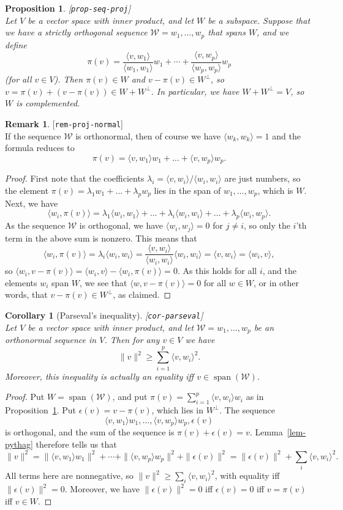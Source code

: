 \documentclass{amsart}
\newcommand{\lbl}[1]{\label{#1}\textup{[\texttt{#1}]}\ \\}
\newcommand{\lbl}{\label}
\newcommand{\spn}       {\operatorname{span}}
\newcommand{\ep}        {\epsilon}
\newcommand{\lm}        {\lambda}
\newcommand{\ip}[1]     {\langle #1\rangle}
\newcommand{\CW}        {{\mathcal{W}}}
\renewcommand{\:}       {\colon}
\newtheorem{proposition}[theorem]{Proposition}
\newtheorem{corollary}[theorem]{Corollary}
\theoremstyle{definition}
\newtheorem{remark}[theorem]{Remark}
\begin{document}
\begin{proposition}\lbl{prop-seq-proj}
 Let $V$ be a vector space with inner product, and let $W$
 be a subspace.  Suppose that we have a strictly orthogonal
 sequence $\CW=w_1,\dotsc,w_p$ that spans $W$, and we define
 \[ \pi(v) = \frac{\ip{v,w_1}}{\ip{w_1,w_1}}w_1 + \dotsb +
             \frac{\ip{v,w_p}}{\ip{w_p,w_p}}w_p
 \]
 (for all $v\in V$).  Then $\pi(v)\in W$ and
 $v-\pi(v)\in W^\perp$, so
 $v=\pi(v)+(v-\pi(v))\in W+W^\perp$.  In particular, we have
 $W+W^\perp=V$, so $W$ is complemented.
\end{proposition}
\begin{remark}\lbl{rem-proj-normal}
 If the sequence $\CW$ is orthonormal, then of course we
 have $\ip{w_k,w_k}=1$ and the formula reduces to
 \[ \pi(v) = \ip{v,w_1}w_1 + \dotsc + \ip{v,w_p}w_p. \]
\end{remark}
\begin{proof}
 First note that the coefficients
 $\lm_i=\ip{v,w_i}/\ip{w_i,w_i}$ are just numbers, so the
 element $\pi(v)=\lm_1w_1+\dotsc+\lm_pw_p$ lies in the span
 of $w_1,\dotsc,w_p$, which is $W$.  Next, we have
 \[ \ip{w_i,\pi(v)} =
      \lm_1\ip{w_i,w_1} + \dotsc + \lm_i\ip{w_i,w_i} +
      \dotsc + \lm_p\ip{w_i,w_p}.
 \]
 As the sequence $\CW$ is orthogonal, we have
 $\ip{w_i,w_j}=0$ for $j\neq i$, so only the $i$'th term in
 the above sum is nonzero.  This means that 
 \[ \ip{w_i,\pi(v)} = \lm_i\ip{w_i,w_i} = 
     \frac{\ip{v,w_i}}{\ip{w_i,w_i}} \ip{w_i,w_i} = 
     \ip{v,w_i} = \ip{w_i,v},
 \]
 so $\ip{w_i,v-\pi(v)}=\ip{w_i,v}-\ip{w_i,\pi(v)}=0$.  As
 this holds for all $i$, and the elements $w_i$ span $W$, we
 see that $\ip{w,v-\pi(v)}=0$ for all $w\in W$, or in other
 words, that $v-\pi(v)\in W^\perp$, as claimed.
\end{proof}

\begin{corollary}[Parseval's inequality]\lbl{cor-parseval}
 Let $V$ be a vector space with inner product, and let
 $\CW=w_1,\dotsc,w_p$ be an orthonormal sequence in $V$.
 Then for any $v\in V$ we have 
 \[ \|v\|^2 \geq \sum_{i=1}^p \ip{v,w_i}^2. \]
 Moreover, this inequality is actually an equality iff
 $v\in\spn(\CW)$. 
\end{corollary}
\begin{proof}
 Put $W=\spn(\CW)$, and put
 $\pi(v)=\sum_{i=1}^p\ip{v,w_i}w_i$ as in
 Proposition~\ref{prop-seq-proj}.  Put $\ep(v)=v-\pi(v)$,
 which lies in $W^\perp$.  The sequence 
 \[ \ip{v,w_1}w_1,\dotsc,\ip{v,w_p}w_p,\ep(v) \]
 is orthogonal, and the sum of the sequence is
 $\pi(v)+\ep(v)=v$.  Lemma~\ref{lem-pythag} therefore tells
 us that 
 \[ \|v\|^2 = \|\ip{v,w_1}w_1\|^2 + \dotsb +
              \|\ip{v,w_p}w_p\|^2 + \|\ep(v)\|^2 
      = \|\ep(v)\|^2 + \sum_i \ip{v,w_i}^2.
 \]
 All terms here are nonnegative, so
 $\|v\|^2\geq\sum_i\ip{v,w_i}^2$, with equality iff
 $\|\ep(v)\|^2=0$.  Moreover, we have $\|\ep(v)\|^2=0$ iff
 $\ep(v)=0$ iff $v=\pi(v)$ iff $v\in W$.
\end{proof}
\end{document}
